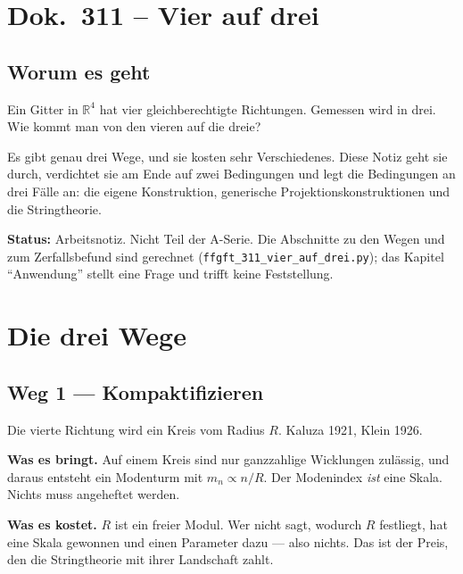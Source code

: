 \maketitle
\tableofcontents

\chapter*{Dok.~311 -- Vier auf drei}

\section*{Worum es geht}

Ein Gitter in $\mathbb{R}^4$ hat vier gleichberechtigte Richtungen.
Gemessen wird in drei. Wie kommt man von den vieren auf die dreie?

Es gibt genau drei Wege, und sie kosten sehr Verschiedenes. Diese Notiz
geht sie durch, verdichtet sie am Ende auf zwei Bedingungen und legt die
Bedingungen an drei Fälle an: die eigene Konstruktion, generische
Projektionskonstruktionen und die Stringtheorie.

\medskip
\noindent\textbf{Status:} Arbeitsnotiz. Nicht Teil der A-Serie.
Die Abschnitte zu den Wegen und zum Zerfallsbefund sind gerechnet
(\texttt{ffgft\_311\_vier\_auf\_drei.py}); das Kapitel
\enquote{Anwendung} stellt eine Frage und trifft keine Feststellung.

\chapter{Die drei Wege}

\section{Weg 1 --- Kompaktifizieren}

Die vierte Richtung wird ein Kreis vom Radius $R$. Kaluza 1921,
Klein 1926.

\textbf{Was es bringt.} Auf einem Kreis sind nur ganzzahlige Wicklungen
zulässig, und daraus entsteht ein Modenturm mit $m_n \propto n/R$. Der
Modenindex \emph{ist} eine Skala. Nichts muss angeheftet werden.

\textbf{Was es kostet.} $R$ ist ein freier Modul. Wer nicht sagt,
wodurch $R$ festliegt, hat eine Skala gewonnen und einen Parameter dazu
--- also nichts. Das ist der Preis, den die Stringtheorie mit ihrer
Landschaft zahlt.

